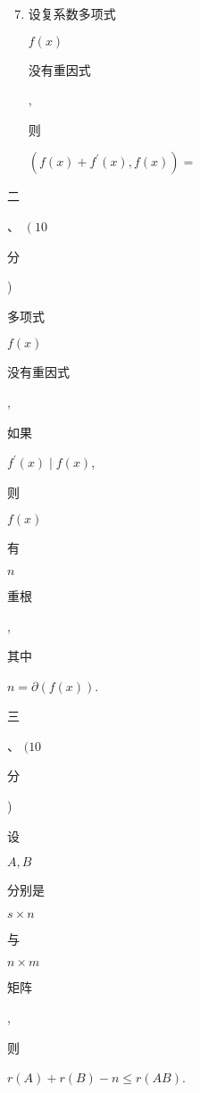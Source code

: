 \documentclass[10pt]{article}
\begin{document}
\begin{enumerate}
  \setcounter{enumi}{6}
  \item \begin{CJK}{UTF8}{mj}设复系数多项式\end{CJK} $f(x)$ \begin{CJK}{UTF8}{mj}没有重因式\end{CJK}, \begin{CJK}{UTF8}{mj}则\end{CJK} $\left(f(x)+f^{\prime}(x), f(x)\right)=$
\end{enumerate}
\begin{CJK}{UTF8}{mj}二\end{CJK}、 $\left(10\right.$ \begin{CJK}{UTF8}{mj}分\end{CJK}) \begin{CJK}{UTF8}{mj}多项式\end{CJK} $f(x)$ \begin{CJK}{UTF8}{mj}没有重因式\end{CJK}, \begin{CJK}{UTF8}{mj}如果\end{CJK} $f^{\prime}(x) \mid f(x)$, \begin{CJK}{UTF8}{mj}则\end{CJK} $f(x)$ \begin{CJK}{UTF8}{mj}有\end{CJK} $n$ \begin{CJK}{UTF8}{mj}重根\end{CJK}, \begin{CJK}{UTF8}{mj}其中\end{CJK} $n=\partial(f(x))$.

\begin{CJK}{UTF8}{mj}三\end{CJK}、 $(10$ \begin{CJK}{UTF8}{mj}分\end{CJK}) \begin{CJK}{UTF8}{mj}设\end{CJK} $A, B$ \begin{CJK}{UTF8}{mj}分别是\end{CJK} $s \times n$ \begin{CJK}{UTF8}{mj}与\end{CJK} $n \times m$ \begin{CJK}{UTF8}{mj}矩阵\end{CJK}, \begin{CJK}{UTF8}{mj}则\end{CJK} $r(A)+r(B)-n \leqslant r(A B)$.
\end{document}

